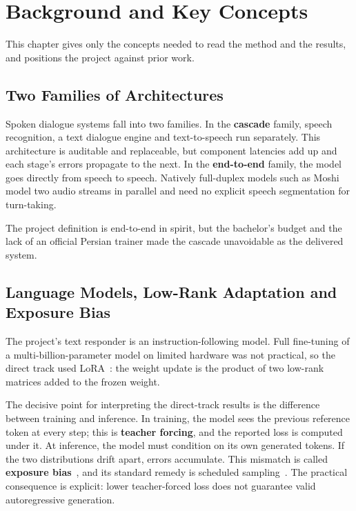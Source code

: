 \chapter{Background and Key Concepts}
\label{ch:background}

This chapter gives only the concepts needed to read the method and the results,
and positions the project against prior work.

\section{Two Families of Architectures}

Spoken dialogue systems fall into two families. In the \textbf{cascade} family,
speech recognition, a text dialogue engine and text-to-speech run separately.
This architecture is auditable and replaceable, but component latencies add up
and each stage's errors propagate to the next. In the \textbf{end-to-end}
family, the model goes directly from speech to speech. Natively full-duplex
models such as Moshi model two audio streams in parallel and need no explicit
speech segmentation for turn-taking.

The project definition is end-to-end in spirit, but the bachelor's budget and
the lack of an official Persian trainer made the cascade unavoidable as the
delivered system.

\section{Language Models, Low-Rank Adaptation and Exposure Bias}

The project's text responder is an instruction-following model. Full fine-tuning
of a multi-billion-parameter model on limited hardware was not practical, so the
direct track used LoRA~\cite{hu2022lora}: the weight update is the product of
two low-rank matrices added to the frozen weight.

The decisive point for interpreting the direct-track results is the difference
between training and inference. In training, the model sees the previous
reference token at every step; this is \textbf{teacher forcing}, and the
reported loss is computed under it. At inference, the model must condition on
its own generated tokens. If the two distributions drift apart, errors
accumulate. This mismatch is called \textbf{exposure
bias}~\cite{ranzato2016scheduledsampling}, and its standard remedy is scheduled
sampling~\cite{bengio2015scheduledsampling}. The practical consequence is
explicit: lower teacher-forced loss does not guarantee valid autoregressive
generation.


